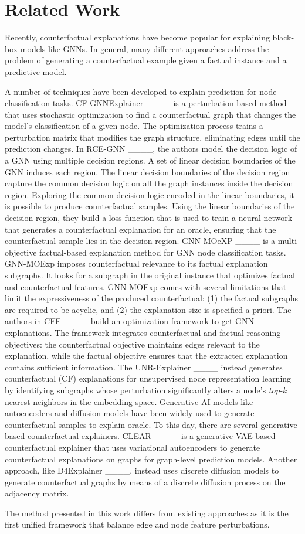 \section{Related Work}
\label{sec:related}
Recently, counterfactual explanations have become popular for explaining black-box models like GNNs. In general, many different approaches address the problem of generating a counterfactual example given a factual instance and a predictive model.

A number of techniques have been developed to explain prediction for node classification tasks. CF-GNNExplainer ____ is a perturbation-based method that uses stochastic optimization to find a counterfactual graph that changes the model's classification of a given node. The optimization process trains a perturbation matrix that modifies the graph structure, eliminating edges until the prediction changes. 
In RCE-GNN ____, the authors model the decision logic of a GNN using multiple decision regions. A set of linear decision boundaries of the GNN induces each region. The linear decision boundaries of the decision region capture the common decision logic on all the graph instances inside the decision region. Exploring the common decision logic encoded in the linear boundaries, it is possible to produce counterfactual samples. Using the linear boundaries of the decision region, they build a loss function that is used to train a neural network that generates a counterfactual explanation for an oracle, ensuring that the counterfactual sample lies in the decision region.
GNN-MOeXP ____ is a multi-objective factual-based explanation method for GNN node classification tasks. GNN-MOExp imposes counterfactual relevance to its factual explanation subgraphs. It looks for a subgraph in the original instance that optimizes factual and counterfactual features. GNN-MOExp comes with several limitations that limit the expressiveness of the produced counterfactual: (1) the factual subgraphs are required to be acyclic, and (2) the explanation size is specified a priori.
The authors in CFF ____ build an optimization framework to get GNN explanations. The framework integrates counterfactual and factual reasoning objectives: the counterfactual objective maintains edges relevant to the explanation, while the factual objective ensures that the extracted explanation contains sufficient information. 
The UNR-Explainer ____  instead generates counterfactual (CF) explanations for unsupervised node representation learning by identifying subgraphs whose perturbation significantly alters a node’s \textit{top-k} nearest neighbors in the embedding space.
Generative AI models like autoencoders and diffusion models have been widely used to generate counterfactual samples to explain oracle. To this day, there are several generative-based counterfactual explainers. CLEAR ____ is a generative VAE-based counterfactual explainer that uses variational autoencoders to generate counterfactual explanations on graphs for graph-level prediction models. Another approach, like D4Explainer ____, instead uses discrete diffusion models to generate counterfactual graphs by means of a discrete diffusion process on the adjacency matrix.

The method presented in this work differs from existing approaches as it is the first unified framework that 
balance edge and node feature perturbations.
\vspace{-1mm}